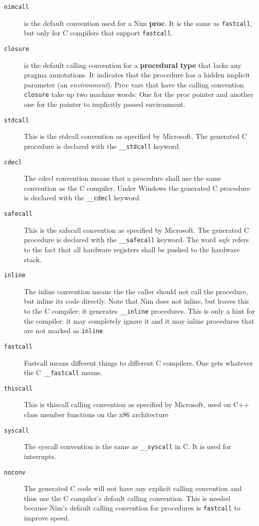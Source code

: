 \begin{description}
\item[\texttt{nimcall}]
is the default convention used for a Nim \textbf{proc}. It is the same
as \texttt{fastcall}, but only for C compilers that support
\texttt{fastcall}.
\item[\texttt{closure}]
is the default calling convention for a \textbf{procedural type} that
lacks any pragma annotations. It indicates that the procedure has a
hidden implicit parameter (an \emph{environment}). Proc vars that have
the calling convention \texttt{closure} take up two machine words: One
for the proc pointer and another one for the pointer to implicitly
passed environment.
\item[\texttt{stdcall}]
This is the stdcall convention as specified by Microsoft. The generated
C procedure is declared with the \texttt{\_\_stdcall} keyword.
\item[\texttt{cdecl}]
The cdecl convention means that a procedure shall use the same
convention as the C compiler. Under Windows the generated C procedure is
declared with the \texttt{\_\_cdecl} keyword.
\item[\texttt{safecall}]
This is the safecall convention as specified by Microsoft. The generated
C procedure is declared with the \texttt{\_\_safecall} keyword. The word
\emph{safe} refers to the fact that all hardware registers shall be
pushed to the hardware stack.
\item[\texttt{inline}]
The inline convention means the the caller should not call the
procedure, but inline its code directly. Note that Nim does not inline,
but leaves this to the C compiler; it generates \texttt{\_\_inline}
procedures. This is only a hint for the compiler: it may completely
ignore it and it may inline procedures that are not marked as
\texttt{inline}.
\item[\texttt{fastcall}]
Fastcall means different things to different C compilers. One gets
whatever the C \texttt{\_\_fastcall} means.
\item[\texttt{thiscall}]
This is thiscall calling convention as specified by Microsoft, used on
C++ class member functions on the x86 architecture
\item[\texttt{syscall}]
The syscall convention is the same as \texttt{\_\_syscall} in C. It is
used for interrupts.
\item[\texttt{noconv}]
The generated C code will not have any explicit calling convention and
thus use the C compiler's default calling convention. This is needed
because Nim's default calling convention for procedures is
\texttt{fastcall} to improve speed.
\end{description}

